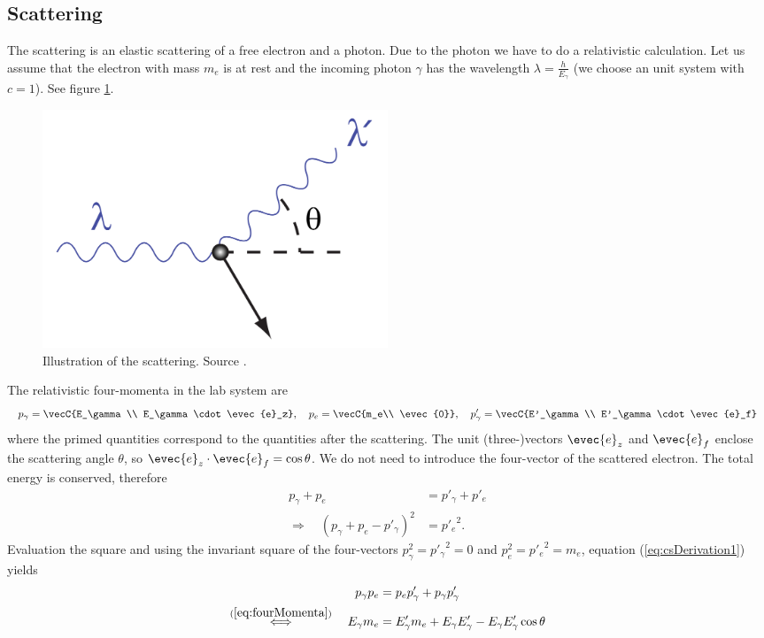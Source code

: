 \subsection{\compton Scattering}
The \compton scattering is an elastic scattering of a free electron and a
photon. Due to the photon we have to do a relativistic calculation. Let us
assume that the electron with mass $m_e$ is at rest and the incoming photon
$\gamma$ has the wavelength $\lambda = \frac{h}{E_\gamma}$ (we choose an unit
system with $c=1$). See figure \ref{fig:compton}.
\begin{figure}[tbp]
  \centering
  \includegraphics[width=0.5\textwidth]{Compton-scattering.png}
  \caption{Illustration of the \compton scattering. Source \cite{streuungBild}.}
  \label{fig:compton}
\end{figure}
The relativistic four-momenta in the lab system are
\begin{align}
  p_\gamma = \vecC{E_\gamma\\ E_\gamma \cdot \evec{e}_z}, \quad
  p_e = \vecC{m_e\\ \evec{0}}, \quad
  p'_\gamma = \vecC{E'_\gamma\\ E'_\gamma \cdot \evec{e}_f}
  \label{eq:fourMomenta}
\end{align}
where the primed quantities correspond to the quantities after the scattering.
The unit (three-)vectors $\evec{e}_z$ and $\evec{e}_f$ enclose the scattering angle
$\theta$, so $\evec{e}_z \cdot \evec{e}_f = \cos \theta$. 
We do not need to introduce the four-vector of the scattered electron.
The total energy is conserved, therefore
\begin{align}
  p_\gamma + p_e &= p'_\gamma + p'_e\\
  \Longrightarrow \quad  (p_\gamma + p_e - p'_\gamma)^2 &= {p'_e}^2.
  \label{eq:csDerivation1}
\end{align}
Evaluation the square and using the invariant square of the four-vectors
$p_\gamma^2 = {p'_\gamma}^2 = 0$ and $p_e^2 = {p'_e}^2 = m_e$, equation
(\ref{eq:csDerivation1}) yields
\begin{align}
  p_\gamma p_e &= p_e p'_\gamma + p_\gamma p'_\gamma \\
  \overset{(\ref{eq:fourMomenta})}{\Longleftrightarrow} \quad
  E_\gamma m_e &= E'_\gamma m_e + E_\gamma E'_\gamma - E_\gamma E'_\gamma \cos
  \theta \label{eq:csDerivation2}
\end{align}
